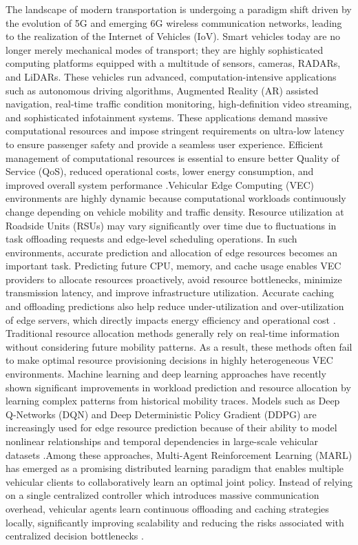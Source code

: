 \documentclass[12pt,a4paper]{report}
\begin{document}
The landscape of modern transportation is undergoing a paradigm shift driven by the evolution of 5G and emerging 6G wireless communication networks, leading to the realization of the Internet of Vehicles (IoV). Smart vehicles today are no longer merely mechanical modes of transport; they are highly sophisticated computing platforms equipped with a multitude of sensors, cameras, RADARs, and LiDARs. These vehicles run advanced, computation-intensive applications such as autonomous driving algorithms, Augmented Reality (AR) assisted navigation, real-time traffic condition monitoring, high-definition video streaming, and sophisticated infotainment systems. These applications demand massive computational resources and impose stringent requirements on ultra-low latency to ensure passenger safety and provide a seamless user experience. Efficient management of computational resources is essential to ensure better Quality of Service (QoS), reduced operational costs, lower energy consumption, and improved overall system performance \cite{vec_concept}.Vehicular Edge Computing (VEC) environments are highly dynamic because computational workloads continuously change depending on vehicle mobility and traffic density. Resource utilization at Roadside Units (RSUs) may vary significantly over time due to fluctuations in task offloading requests and edge-level scheduling operations. In such environments, accurate prediction and allocation of edge resources becomes an important task. Predicting future CPU, memory, and cache usage enables VEC providers to allocate resources proactively, avoid resource bottlenecks, minimize transmission latency, and improve infrastructure utilization. Accurate caching and offloading predictions also help reduce under-utilization and over-utilization of edge servers, which directly impacts energy efficiency and operational cost \cite{mobility_caching}.\\

Traditional resource allocation methods generally rely on real-time information without considering future mobility patterns. As a result, these methods often fail to make optimal resource provisioning decisions in highly heterogeneous VEC environments. Machine learning and deep learning approaches have recently shown significant improvements in workload prediction and resource allocation by learning complex patterns from historical mobility traces. Models such as Deep Q-Networks (DQN) and Deep Deterministic Policy Gradient (DDPG) are increasingly used for edge resource prediction because of their ability to model nonlinear relationships and temporal dependencies in large-scale vehicular datasets \cite{joint_caching_offloading}.Among these approaches, Multi-Agent Reinforcement Learning (MARL) has emerged as a promising distributed learning paradigm that enables multiple vehicular clients to collaboratively learn an optimal joint policy. Instead of relying on a single centralized controller which introduces massive communication overhead, vehicular agents learn continuous offloading and caching strategies locally, significantly improving scalability and reducing the risks associated with centralized decision bottlenecks \cite{maddpg_paper}.\\
\end{document}
